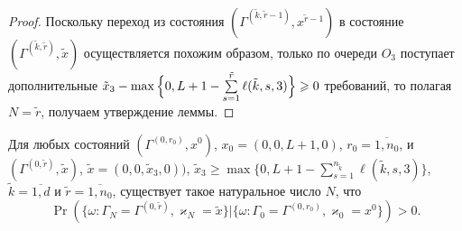 \documentclass[a4paper,12pt,russian]{extarticle}
\begin{document}
\begin{proof}
Поскольку переход из состояния $(\Gamma^{(\tilde{k},\tilde{r}-1)}, x^{\tilde{r}-1})$ в состояние  $(\Gamma^{(\tilde{k},\tilde{r})}, \tilde{x})$ осуществляется похожим образом, только по очереди $O_3$ поступает дополнительные $\tilde{x}_3 \hm- \max{\Bigl\{0,L+1-\sum\limits_{s=1}^{\tilde{r}} \ell(\tilde{k},s,3)\Bigr\}}\geqslant 0$ требований, то полагая $N=\tilde{r}$, получаем утверждение леммы.
\end{proof}


\begin{lemma}
Для любых состояний $(\Gamma^{(0,r_0)},x^0)$, $x_0=(0,0,L+1,0)$, $r_0=\overline{1,n_0}$, и
$(\Gamma^{(0,\tilde{r})},\tilde{x})$,
$\tilde{x}=(0,0,\tilde{x}_3,0))$, $\tilde{x}_3 \geqslant \max{\{0,L+1-\sum_{s=1}^{n_{\tilde{k}}} \ell(\tilde{k},s,3)\}}$,
$\tilde{k}=\overline{1,d}$ и $\tilde{r} = \overline{1,n_0}$, существует такое натуральное число $N$, что 
\begin{equation*}
\Pr(\{\omega\colon \Gamma_{N}=\Gamma^{(0,\tilde{r} )}, \varkappa_{N}=\tilde{x}\}|\{\omega\colon 
\Gamma_{0}=\Gamma^{(0,r_0)}, \varkappa_{0}=x^0\})>0.
\end{equation*}
\end{lemma}
\end{document}
